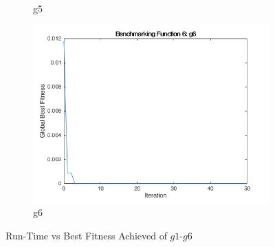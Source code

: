 \begin{figure}
\begin{subfigure}[b]{0.4\textwidth}
    \caption{g5}
  \end{subfigure}
  \begin{subfigure}[b]{0.4\textwidth}
    \includegraphics[width=\textwidth]{img/summary/g6}
    \caption{g6}
  \end{subfigure}
  \caption{Run-Time vs Best Fitness Achieved of $g1$-$g6$}
\end{figure}

